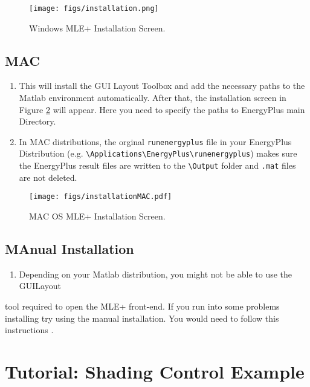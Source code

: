 \documentclass[11pt]{article}
\begin{document}
\begin{figure}[htb]
\centering
\texttt{[image: figs/installation.png]}
\caption{\label{fig:installScreen}Windows MLE+ Installation Screen.}
\end{figure}

\subsection{MAC}
\label{sec-3-2}

\begin{enumerate}
\item This will install the
GUI Layout Toolbox and add the necessary paths to the Matlab
environment automatically. After that, the installation screen in 
Figure \ref{fig:installScreenMAC} will appear. Here you need to specify the 
paths to EnergyPlus main Directory.
\item In MAC distributions, the orginal \texttt{runenergyplus} file in your
EnergyPlus Distribution (e.g. \texttt{\textbackslash{}Applications\textbackslash{}EnergyPlus\textbackslash{}runenergyplus}) makes sure 
the EnergyPlus result files are written to the \texttt{\textbackslash{}Output} folder and \texttt{.mat} files
are not deleted.
\end{enumerate}

\begin{figure}[htb]
\centering
\texttt{[image: figs/installationMAC.pdf]}
\caption{\label{fig:installScreenMAC}MAC OS MLE+ Installation Screen.}
\end{figure}

\subsection{MAnual Installation}
\label{sec-3-3}

\begin{enumerate}
\item Depending on your Matlab distribution, you might not be able to use the GUILayout
\end{enumerate}
tool required to open the MLE+ front-end. If you run into some problems installing try 
using the manual installation. You would need to follow this instructions .


\section{Tutorial: Shading Control Example}
\label{sec-4}
\end{document}

